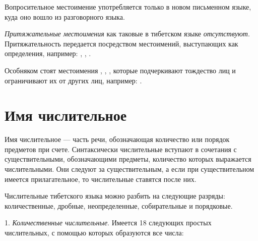 Вопросительное местоимение  употребляется только в новом письменном языке, куда оно вошло из разговорного языка.

\emph{Притяжательные местоимения} как таковые в тибетском языке \emph{отсутствуют}. Притяжательность передается посредством местоимений, выступающих как определения, например:
,
,
.

Особняком стоят местоимения	, , , которые подчеркивают тождество лиц и ограничивают их от других лиц, например: .

\section{Имя числительное}

Имя числительное --- часть речи, обозначающая количество или порядок предметов при счете. Синтаксически числительные вступают в сочетания с существительными, обозначающими предметы, количество которых выражается числительными. Они следуют за существительным, а если при существительном имеется прилагательное, то числительные ставятся после них.

Числительные тибетского языка можно разбить на следующие разряды: количественные, дробные, неопределенные, собирательные и порядковые.

1. \emph{Количественные числительные}. Имеется 18 следующих простых числительных, с помощью которых образуются все числа:

\begin{multicols}{2}
    \\
    \\
    \\
    \\
    \\
    \\
    \\
    \\
    \\
    \\
    \\
    \\
    \\
    \\
    \\
    \\
    \\
    \\
\end{multicols}

